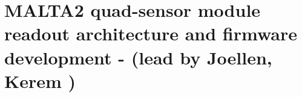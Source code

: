 \documentclass[pdftex,twocolumn,epjc3]{svjour3}          %
\begin{document}




\section{MALTA2 quad-sensor module readout architecture and firmware development - (lead by Joellen, Kerem )}\label{sec:firm}
\end{document}
